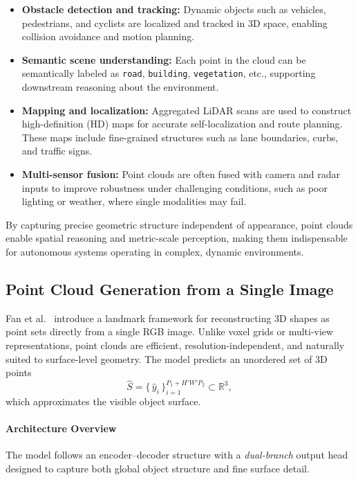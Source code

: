 \begin{itemize}
    \item \textbf{Obstacle detection and tracking:} Dynamic objects such as vehicles, pedestrians, and cyclists are localized and tracked in 3D space, enabling collision avoidance and motion planning.
    \item \textbf{Semantic scene understanding:} Each point in the cloud can be semantically labeled as \texttt{road}, \texttt{building}, \texttt{vegetation}, etc., supporting downstream reasoning about the environment.
    \item \textbf{Mapping and localization:} Aggregated LiDAR scans are used to construct high-definition (HD) maps for accurate self-localization and route planning. These maps include fine-grained structures such as lane boundaries, curbs, and traffic signs.
    \item \textbf{Multi-sensor fusion:} Point clouds are often fused with camera and radar inputs to improve robustness under challenging conditions, such as poor lighting or weather, where single modalities may fail.
\end{itemize}

By capturing precise geometric structure independent of appearance, point clouds enable spatial reasoning and metric-scale perception, making them indispensable for autonomous systems operating in complex, dynamic environments.

\subsection{Point Cloud Generation from a Single Image}
\label{subsec:pointcloud_fan}

Fan et al.~\cite{fan2017_pointset} introduce a landmark framework for reconstructing 3D shapes as point sets directly from a single RGB image. Unlike voxel grids or multi-view representations, point clouds are efficient, resolution-independent, and naturally suited to surface-level geometry. The model predicts an unordered set of 3D points
\[
\hat{S} = \{\,\hat{y}_i\,\}_{i=1}^{P_1 + H'W'P_2} \subset \mathbb{R}^3,
\]
which approximates the visible object surface.

\paragraph{Architecture Overview}
The model follows an encoder–decoder structure with a \emph{dual-branch} output head designed to capture both global object structure and fine surface detail.

